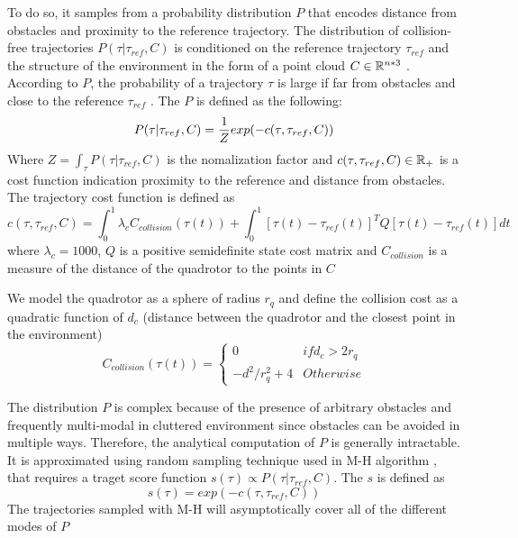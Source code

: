 To do so, it samples from a probability distribution $P$ that encodes distance from obstacles and proximity to the reference trajectory. The distribution of collision-free trajectories $P(\tau | \tau_{ref}, C)$ is
conditioned on the reference trajectory $\tau_{ref}$ and the structure of the
environment in the form of a point cloud $C \in \mathbb{R}^{n*3}$ . According to $P$,
the probability of a trajectory $\tau$ is large if far from obstacles and close
to the reference $\tau_{ref}$ . The $P$ is defined as the following:
\begin{equation}
	P(\tau | \tau_{ref},C) = \frac{1}{Z} exp(-c(\tau, \tau_{ref},C)) \\
\end{equation}
Where $	Z = \int_{\tau} P(\tau | \tau_{ref},C)$ is the nomalization factor and $c(\tau, \tau_{ref},C) \in \mathbb{R}_+$ is a cost function indication proximity to the reference and distance from obstacles. The trajectory cost function is defined as 
\begin{equation}
	c(\tau, \tau_{ref},C) = \int_0^1 \lambda_c C_{collision}(\tau(t)) + \int_0^1 [\tau(t)-\tau_{ref}(t)]^T Q[\tau(t)-\tau_{ref}(t)]{dt}
	\label{eqn:collision}
\end{equation}
where $\lambda_c = 1000$, $Q$ is a positive semidefinite state cost matrix and $C_{collision}$ is a measure of the distance of the quadrotor to the points in $C$

We model the quadrotor as a sphere of radius $r_q$ and define the collision cost as a quadratic function of $d_c$ (distance between the quadrotor and the closest point in the environment)
\begin{equation}
	C_{collision}(\tau(t)) = 
	\begin{cases}
		0 & if d_c > 2r_q \\
		-d^2/r_q^2 + 4 & Otherwise
	\end{cases}
\end{equation}

The distribution $P$ is complex because of the presence of arbitrary obstacles and frequently multi-modal in cluttered environment since obstacles can be avoided in multiple ways. Therefore, the analytical computation of $P$ is generally intractable. It is approximated using random sampling technique used in M-H algorithm \cite{MH_hasting}, that requires a traget score function $s(\tau) \propto P(\tau | \tau_{ref},C)$. The $s$ is defined as 
\begin{equation}
	s(\tau) = exp(-c(\tau, \tau_{ref},C))
\end{equation}
The trajectories sampled with M-H will asymptotically cover all of the different modes of $P$



